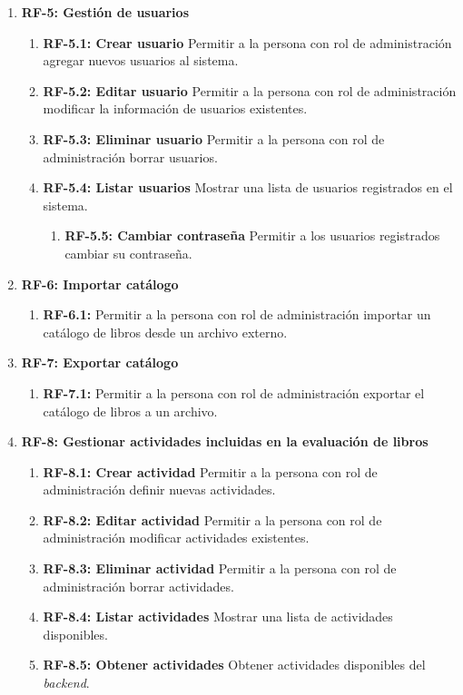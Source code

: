 \begin{enumerate}
    \item \textbf{RF-5: Gestión de usuarios}
    \begin{enumerate}
        \item \textbf{RF-5.1: Crear usuario} Permitir a la persona con rol de administración agregar nuevos usuarios al sistema.
        \item \textbf{RF-5.2: Editar usuario} Permitir a la persona con rol de administración modificar la información de usuarios existentes.
        \item \textbf{RF-5.3: Eliminar usuario} Permitir a la persona con rol de administración borrar usuarios.
        \item \textbf{RF-5.4: Listar usuarios} Mostrar una lista de usuarios registrados en el sistema.
        \begin{enumerate}
        \item \textbf{RF-5.5: Cambiar contraseña} Permitir a los usuarios registrados cambiar su contraseña.
    \end{enumerate}
    \end{enumerate}

    \item \textbf{RF-6: Importar catálogo}
    \begin{enumerate}
        \item \textbf{RF-6.1:} Permitir a la persona con rol de administración importar un catálogo de libros desde un archivo externo.
    \end{enumerate}

    \item \textbf{RF-7: Exportar catálogo}
    \begin{enumerate}
        \item \textbf{RF-7.1:} Permitir a la persona con rol de administración exportar el catálogo de libros a un archivo.
    \end{enumerate}

    \item \textbf{RF-8: Gestionar actividades incluidas en la evaluación de libros}
    \begin{enumerate}
        \item \textbf{RF-8.1: Crear actividad} Permitir a la persona con rol de administración definir nuevas actividades.
        \item \textbf{RF-8.2: Editar actividad} Permitir a la persona con rol de administración modificar actividades existentes.
        \item \textbf{RF-8.3: Eliminar actividad} Permitir a la persona con rol de administración borrar actividades.
        \item \textbf{RF-8.4: Listar actividades} Mostrar una lista de actividades disponibles.
        \item \textbf{RF-8.5: Obtener actividades} Obtener actividades disponibles del \textit{backend}.
    \end{enumerate}


\end{enumerate}
